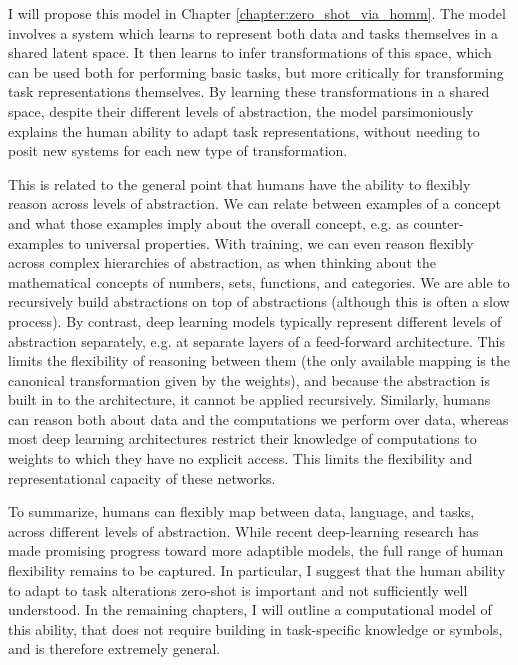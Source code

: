 I will propose this model in Chapter \ref{chapter:zero_shot_via_homm}. The model involves a system which learns to represent both data and tasks themselves in a shared latent space. It then learns to infer transformations of this space, which can be used both for performing basic tasks, but more critically for transforming task representations themselves. By learning these transformations in a shared space, despite their different levels of abstraction, the model parsimoniously explains the human ability to adapt task representations, without needing to posit new systems for each new type of transformation. \par
This is related to the general point that humans have the ability to flexibly reason across levels of abstraction. We can relate between examples of a concept and what those examples imply about the overall concept, e.g. as counter-examples to universal properties. With training, we can even reason flexibly across complex hierarchies of abstraction, as when thinking about the mathematical concepts of numbers, sets, functions, and categories. We are able to recursively build abstractions on top of abstractions (although this is often a slow process). By contrast, deep learning models typically represent different levels of abstraction separately, e.g. at separate layers of a feed-forward architecture. This limits the flexibility of reasoning between them (the only available mapping is the canonical transformation given by the weights), and because the abstraction is built in to the architecture, it cannot be applied recursively. Similarly, humans can reason both about data and the computations we perform over data, whereas most deep learning architectures restrict their knowledge of computations to weights to which they have no explicit access. This limits the flexibility and representational capacity of these networks. \par 
To summarize, humans can flexibly map between data, language, and tasks, across different levels of abstraction. While recent deep-learning research has made promising progress toward more adaptible models, the full range of human flexibility remains to be captured. In particular, I suggest that the human ability to adapt to task alterations zero-shot is important and not sufficiently well understood. In the remaining chapters, I will outline a computational model of this ability, that does not require building in task-specific knowledge or symbols, and is therefore extremely general. \par
